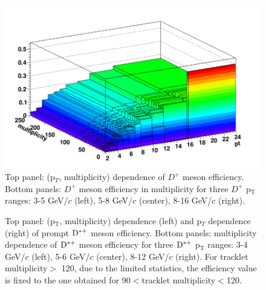\begin{figure}[h]
	\includegraphics[width=.48\linewidth]{figures/Effs/EfficiencyMap_2D_Dzero_b_Ref_wLimAcc_Plot.png} 
	\caption{Top panel: (p$_T$, multiplicity) dependence of $D^+$ meson efficiency. Bottom panels: $D^+$ meson efficiency in multiplicity for three $D^+$ p$_\mathrm{T}$ranges: 3-5 GeV/$c$ (left), 5-8 GeV/$c$ (center), 8-16 GeV/$c$ (right).}
	\label{fig:dpluseff}	
\end{figure}

\begin{figure}[!htp]
	\centering
\caption{Top panel: (p$_\mathrm{T}$, multiplicity) dependence (left) and p$_T$ dependence (right) of prompt ${\rm D^{*+}}$ meson efficiency. Bottom panels: multiplicity dependence of ${\rm D^{*+}}$ meson efficiency for three ${\rm D^{*+}}$ p$_\mathrm{T}$ ranges: 3-4 GeV/$c$ (left), 5-6 GeV/$c$ (center), 8-12 GeV/$c$ (right). For tracklet multiplicity$>$ 120, due to the limited statistics, the efficiency value is fixed to the one obtained for 90$<$tracklet multiplicity$<$120.}
	\label{fig:dstareff}	
\end{figure}
\newpage 
